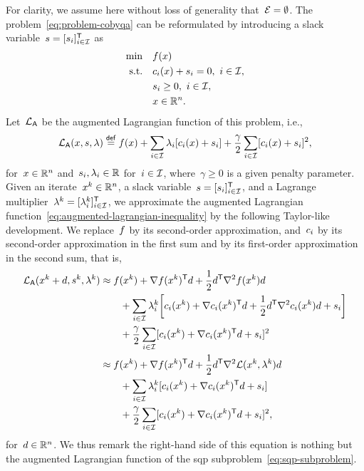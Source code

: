 For clarity, we assume here without loss of generality that~$\mathcal{E} = \emptyset$.
The problem~\cref{eq:problem-cobyqa} can be reformulated by introducing a slack variable~$s = [s_i]_{i \in \mathcal{I}}^{\mathsf{T}}$ as
\begin{align*}
    \min        & \quad f(x)\\
    \text{s.t.} & \quad c_{i}(x) + s_i = 0, ~ i \in \mathcal{I},\\
                & \quad s_i \ge 0, ~ i \in \mathcal{I},\\
                & \quad x \in \mathbb{R}^n.
\end{align*}
Let~$\lag[\mathsf{A}]$ be the augmented Lagrangian function of this problem, i.e.,
\begin{equation}
    \label{eq:augmented-lagrangian-inequality}
    \lag[\mathsf{A}](x, s, \lambda) \eqdef \obj(x) + \sum_{i \in \iub} \lambda_i [\con{i}(x) + s_i] + \frac{\gamma}{2} \sum_{i \in \iub} [\con{i}(x) + s_i]^2,
\end{equation}
for~$x \in \mathbb{R}^n$ and~$s_i, \lambda_i \in \mathbb{R}$ for~$i \in \mathcal{I}$, where~$\gamma \ge 0$ is a given penalty parameter.
Given an iterate~$x^k \in \mathbb{R}^n$, a slack variable~$s = [s_i]_{i \in \mathcal{I}}^{\mathsf{T}}$, and a Lagrange multiplier~$\lambda^k = [\lambda_i^k]_{i \in \mathcal{I}}^{\mathsf{T}}$, we approximate the augmented Lagrangian function~\cref{eq:augmented-lagrangian-inequality} by the following Taylor-like development.
We replace~$f$ by its second-order approximation, and~$c_{i}$ by its second-order approximation in the first sum and by its first-order approximation in the second sum, that is,
\begin{align*}
    \lag[\mathsf{A}](x^k + d, s^k, \lambda^k)   & \approx \obj(x^k) + \nabla \obj(x^k)^{\T} d + \frac{1}{2} d^{\T} \nabla^2 \obj(x^k) d\\
                                                & \qquad + \sum_{i \in \iub} \lambda_i^k \bigg[ \con{i}(x^k) + \nabla \con{i}(x^k)^{\T} d + \frac{1}{2} d^{\T} \nabla^2 \con{i}(x^k) d + s_i \bigg]\\
                                                & \qquad + \frac{\gamma}{2} \sum_{i \in \iub} [\con{i}(x^k) + \nabla \con{i}(x^k)^{\T} d + s_i]^2\\
                                                & \approx \obj(x^k) + \nabla \obj(x^k)^{\T} d + \frac{1}{2} d^{\T} \nabla^2 \lag(x^k, \lambda^k) d\\
                                                & \qquad + \sum_{i \in \iub} \lambda_i^k [\con{i}(x^k) + \nabla \con{i}(x^k)^{\T} d + s_i]\\
                                                & \qquad + \frac{\gamma}{2} \sum_{i \in \iub} [\con{i}(x^k) + \nabla \con{i}(x^k)^{\T} d + s_i]^2,
\end{align*}
for~$d \in \mathbb{R}^n$.
We thus remark the right-hand side of this equation is nothing but the augmented Lagrangian function of the \gls{sqp} subproblem~\cref{eq:sqp-subproblem}.

